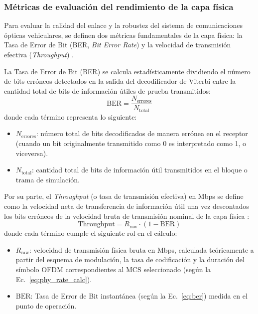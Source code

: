 \subsubsection{Métricas de evaluación del rendimiento de la capa física}
Para evaluar la calidad del enlace y la robustez del sistema de comunicaciones ópticas vehiculares, se definen dos métricas fundamentales de la capa física: la Tasa de Error de Bit (BER, \textit{Bit Error Rate}) y la velocidad de transmisión efectiva (\textit{Throughput}) \cite{ghassemlooy2019optical}.

La Tasa de Error de Bit (BER) se calcula estadísticamente dividiendo el número de bits erróneos detectados en la salida del decodificador de Viterbi entre la cantidad total de bits de información útiles de prueba transmitidos:
\begin{equation}
	\text{BER} = \frac{N_{\text{errores}}}{N_{\text{total}}}
	\label{eq:ber}
\end{equation}
donde cada término representa lo siguiente:
\begin{itemize}
	\item $N_{\text{errores}}$: número total de bits decodificados de manera errónea en el receptor (cuando un bit originalmente transmitido como 0 es interpretado como 1, o viceversa).
	\item $N_{\text{total}}$: cantidad total de bits de información útil transmitidos en el bloque o trama de simulación.
\end{itemize}

Por su parte, el \textit{Throughput} (o tasa de transmisión efectiva) en Mbps se define como la velocidad neta de transferencia de información útil una vez descontados los bits erróneos de la velocidad bruta de transmisión nominal de la capa física \cite{ghassemlooy2019optical, elgala2011indoor}:
\begin{equation}
	\text{Throughput} = R_{\text{raw}} \cdot (1 - \text{BER})
	\label{eq:throughput}
\end{equation}
donde cada término cumple el siguiente rol en el cálculo:
\begin{itemize}
	\item $R_{\text{raw}}$: velocidad de transmisión física bruta en Mbps, calculada teóricamente a partir del esquema de modulación, la tasa de codificación y la duración del símbolo OFDM correspondientes al MCS seleccionado (según la Ec.~\ref{eq:phy_rate_calc}).
	\item $\text{BER}$: Tasa de Error de Bit instantánea (según la Ec.~\ref{eq:ber}) medida en el punto de operación.
\end{itemize}



